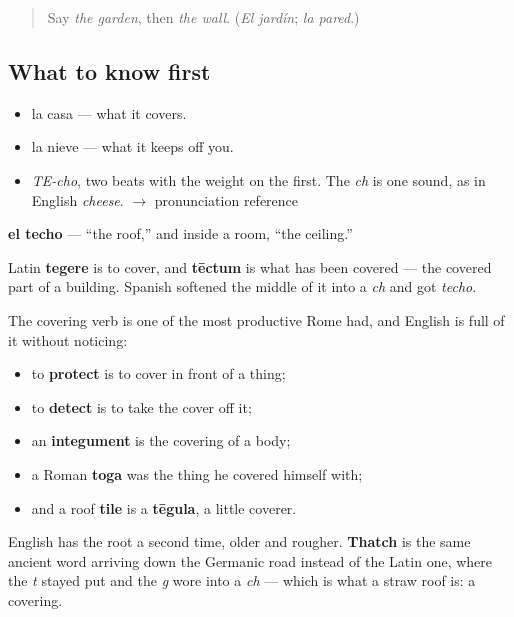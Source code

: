 \label{lesson:ES-C355-techo}



\begin{quote}
Say \emph{the garden}, then \emph{the wall}. (\emph{El jardín}; \emph{la pared}.)
\end{quote}

\subsection*{What to know first}
\begin{itemize}
\raggedright
  \item la casa — what it covers.
  \item la nieve — what it keeps off you.
\end{itemize}

\begin{sounds}
\begin{itemize}
\raggedright
  \item \emph{TE-cho}, two beats with the weight on the first. The \emph{ch} is one sound, as in English \emph{cheese}. $\to$ pronunciation reference
\end{itemize}
\end{sounds}

\begin{cousinweb}
\textbf{el techo} — \textquotedblleft{}the roof,\textquotedblright{} and inside a room, \textquotedblleft{}the ceiling.\textquotedblright{}

Latin \textbf{tegere} is to cover, and \textbf{tēctum} is what has been covered — the covered part of a building. Spanish softened the middle of it into a \emph{ch} and got \emph{techo}.

The covering verb is one of the most productive Rome had, and English is full of it without noticing:

\begin{itemize}
\raggedright
  \item to \textbf{protect} is to cover in front of a thing;
  \item to \textbf{detect} is to take the cover off it;
  \item an \textbf{integument} is the covering of a body;
  \item a Roman \textbf{toga} was the thing he covered himself with;
  \item and a roof \textbf{tile} is a \textbf{tēgula}, a little coverer.
\end{itemize}

English has the root a second time, older and rougher. \textbf{Thatch} is the same ancient word arriving down the Germanic road instead of the Latin one, where the \emph{t} stayed put and the \emph{g} wore into a \emph{ch} — which is what a straw roof is: a covering.
\end{cousinweb}

